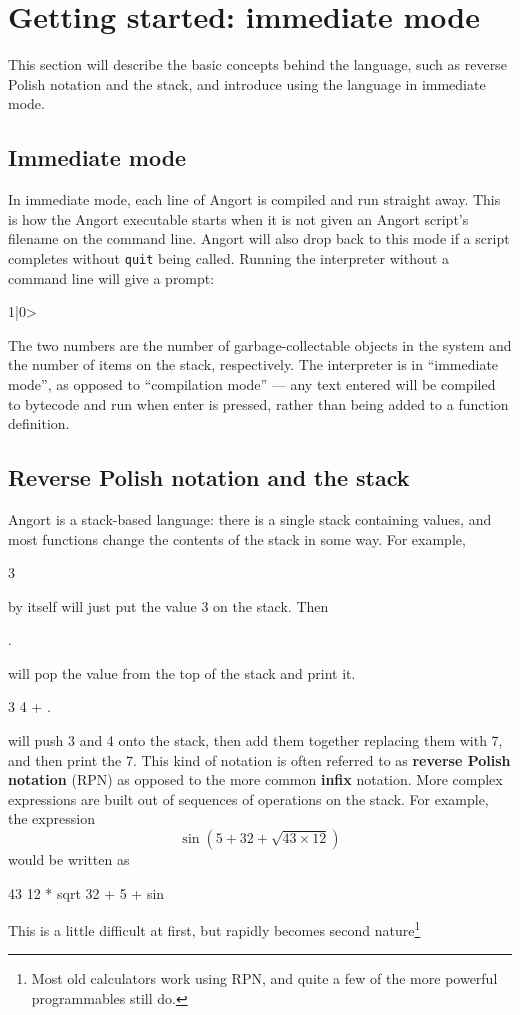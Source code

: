 \clearpage
    \section{Getting started: immediate mode}
This section will describe the basic concepts behind the language,
such as reverse Polish notation and the stack, and introduce
using the language in immediate mode.   

\subsection{Immediate mode}
In immediate mode, each line of Angort is compiled and run straight
away. This is how the Angort executable starts when it is not
given an Angort script's filename on the command line. Angort will also
drop back to this mode if a script completes without \texttt{quit} 
being called.
Running the interpreter without a command line will give a prompt:
\begin{v}
1|0>
\end{v}
The two numbers are the number of garbage-collectable objects in the
system and the number of items on the stack, respectively.
The interpreter is in ``immediate mode'', as opposed to ``compilation
mode'' --- any text entered will be compiled to bytecode and run when
enter is pressed,
rather than being added to a function definition.

\subsection{Reverse Polish notation and the stack}
Angort is a stack-based language:
there is a single stack containing
values, and most functions change the contents
of the stack in some way. For example,
\begin{v}
3
\end{v}
by itself will just put the value 3 on the stack. Then
\begin{v}
.
\end{v}
will pop the value from the top of the stack and print it.
\begin{v}
3 4 + .
\end{v}
will push 3 and 4 onto the stack, then add them together replacing them
with 7, and then print the 7. This kind of notation is often
referred to as \textbf{reverse Polish notation} (RPN) as opposed to the more common
\textbf{infix} notation. More complex expressions are built 
out of sequences of operations on the stack. For example, the expression
\[
\sin(5+32+\sqrt{43 \times 12})
\]
would be written as
\begin{v}
43 12 * sqrt 32 + 5 + sin
\end{v}
This is a little difficult at first, but rapidly becomes second
nature\footnote{Most old calculators work using RPN, and quite a few
of the more powerful programmables still do.}

